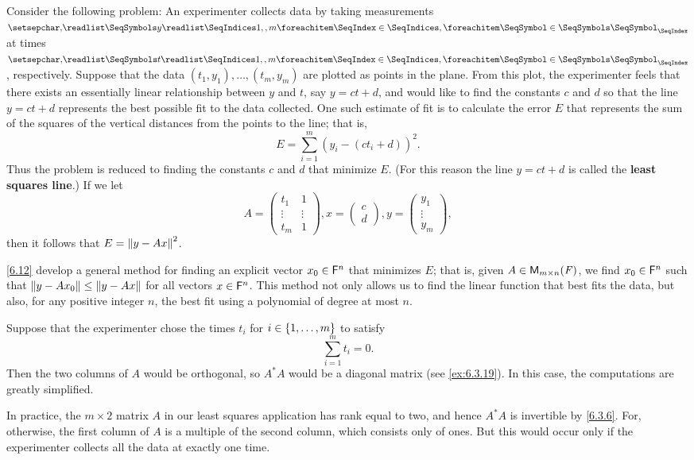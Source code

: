 \begin{note}
	Consider the following problem:
	An experimenter collects data by taking measurements \(\seq{y}{1,,m}\) at times \(\seq{t}{1,,m}\), respectively.
	Suppose that the data \((t_1, y_1), \dots, (t_m, y_m)\) are plotted as points in the plane.
	From this plot, the experimenter feels that there exists an essentially linear relationship between \(y\) and \(t\), say \(y = ct + d\), and would like to find the constants \(c\) and \(d\) so that the line \(y = ct + d\) represents the best possible fit to the data collected.
	One such estimate of fit is to calculate the error \(E\) that represents the sum of the squares of the vertical distances from the points to the line;
	that is,
	\[
		E = \sum_{i = 1}^m (y_i - (c t_i + d))^2.
	\]
	Thus the problem is reduced to finding the constants \(c\) and \(d\) that minimize \(E\).
	(For this reason the line \(y = ct + d\) is called the \textbf{least squares line}.)
	If we let
	\[
		A = \begin{pmatrix}
			t_1    & 1      \\
			\vdots & \vdots \\
			t_m    & 1
		\end{pmatrix}, x = \begin{pmatrix}
			c \\
			d
		\end{pmatrix}, y = \begin{pmatrix}
			y_1    \\
			\vdots \\
			y_m
		\end{pmatrix},
	\]
	then it follows that \(E = \left\lVert y - Ax\right\rVert^2\).

	\cref{6.12} develop a general method for finding an explicit vector \(x_0 \in \mathsf{F}^n\) that minimizes \(E\);
	that is, given \(A \in \mathsf{M}_{{m} \times n}({\mathit{F}})\), we find \(x_0 \in \mathsf{F}^n\) such that \(\left\lVert y - A x_0\right\rVert \leq \left\lVert y - Ax\right\rVert\) for all vectors \(x \in \mathsf{F}^n\).
	This method not only allows us to find the linear function that best fits the data, but also, for any positive integer \(n\), the best fit using a polynomial of degree at most \(n\).

	Suppose that the experimenter chose the times \(t_i\) for \(i \in \left\lbrace1, \dots, m\right\rbrace\) to satisfy
	\[
		\sum_{i = 1}^m t_i = 0.
	\]
	Then the two columns of \(A\) would be orthogonal, so \(A^* A\) would be a diagonal matrix (see \cref{ex:6.3.19}).
	In this case, the computations are greatly simplified.

	In practice, the \(m \times 2\) matrix \(A\) in our least squares application has rank equal to two, and hence \(A^* A\) is invertible by \cref{6.3.6}.
	For, otherwise, the first column of \(A\) is a multiple of the second column, which consists only of ones.
	But this would occur only if the experimenter collects all the data at exactly one time.


\end{note}
